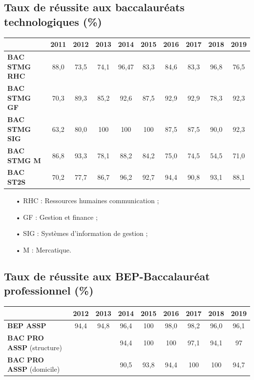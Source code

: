 \documentclass[12pt,a4paper, fleqn]{report}
\begin{document}
\subsection{Taux de réussite aux baccalauréats technologiques (\%)}

\begin{center}
\begin{tabular}{l|c|c|c|c|c|c|c|c|c}
		& \textbf{2011} & \textbf{2012} & \textbf{2013} & \textbf{2014} & \textbf{2015} & \textbf{2016} & \textbf{2017} & \textbf{2018} & \textbf{2019} \\
\hline \hline
\textbf{BAC STMG RHC} 		& 88{,}0 & 73{,}5 & 74{,}1 & 96{,}47 & 83{,}3 & 84{,}6 & 83{,}3 & 96{,}8 & 76{,}5 \\
\hline
\textbf{BAC STMG GF}  & 70{,}3 & 89{,}3 & 85{,}2 & 92{,}6 & 87{,}5 & 92{,}9 & 92{,}9 & 78{,}3 & 92{,}3 \\
\hline
\textbf{BAC STMG SIG}		& 63{,}2 & 80{,}0 & 100 & 100 & 100 & 87{,}5 & 87{,}5 & 90{,}0 & 92{,}3 \\
\hline
\textbf{BAC STMG M} & 86{,}8 & 93{,}3 & 78{,}1 & 88{,}2 & 84{,}2 & 75{,}0 & 74{,}5 & 54{,}5 & 71{,}0 \\
\hline
\textbf{BAC ST2S} & 70{,}2 & 77{,}7 & 86{,}7 & 96{,}2 & 92{,}7 & 94{,}4 & 90{,}8 & 93{,}1 & 88{,}1 \\
\end{tabular}
\end{center}

\begin{itemize}
\item[•] RHC : Ressources humaines communication ;
\item[•] GF : Gestion et finance ;
\item[•] SIG : Systèmes d'information de gestion ;
\item[•] M : Mercatique.
\end{itemize}

\subsection{Taux de réussite aux BEP-Baccalauréat professionnel (\%)}

\begin{center}
\begin{tabular}{l|c|c|c|c|c|c|c|c}
		& \textbf{2012} & \textbf{2013} & \textbf{2014} & \textbf{2015} & \textbf{2016} & \textbf{2017} & \textbf{2018} & \textbf{2019} \\
\hline \hline
\textbf{BEP ASSP} 		& 94{,}4 & 94{,}8 & 96{,}4 & 100 & 98{,}0 & 98{,}2 & 96{,}0 & 96{,}1 \\
\hline
\textbf{BAC PRO ASSP} (structure) 	& & & 94{,}4 & 100 & 100 & 97{,}1 & 94{,}1 & 97 \\
\hline
\textbf{BAC PRO ASSP}	(domicile)	& & & 90{,}5 & 93{,}8 & 94{,}4 & 100 & 100 & 94{,}7 \\
\end{tabular}
\end{center}
\end{document}
